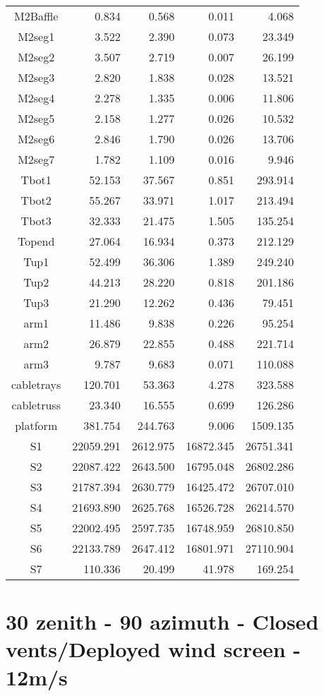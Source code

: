 \begin{longtable}{crrrr}
 M2Baffle & 0.834 & 0.568 & 0.011 & 4.068 \\
 M2seg1 & 3.522 & 2.390 & 0.073 & 23.349 \\
 M2seg2 & 3.507 & 2.719 & 0.007 & 26.199 \\
 M2seg3 & 2.820 & 1.838 & 0.028 & 13.521 \\
 M2seg4 & 2.278 & 1.335 & 0.006 & 11.806 \\
 M2seg5 & 2.158 & 1.277 & 0.026 & 10.532 \\
 M2seg6 & 2.846 & 1.790 & 0.026 & 13.706 \\
 M2seg7 & 1.782 & 1.109 & 0.016 & 9.946 \\
 Tbot1 & 52.153 & 37.567 & 0.851 & 293.914 \\
 Tbot2 & 55.267 & 33.971 & 1.017 & 213.494 \\
 Tbot3 & 32.333 & 21.475 & 1.505 & 135.254 \\
 Topend & 27.064 & 16.934 & 0.373 & 212.129 \\
 Tup1 & 52.499 & 36.306 & 1.389 & 249.240 \\
 Tup2 & 44.213 & 28.220 & 0.818 & 201.186 \\
 Tup3 & 21.290 & 12.262 & 0.436 & 79.451 \\
 arm1 & 11.486 & 9.838 & 0.226 & 95.254 \\
 arm2 & 26.879 & 22.855 & 0.488 & 221.714 \\
 arm3 & 9.787 & 9.683 & 0.071 & 110.088 \\
 cabletrays & 120.701 & 53.363 & 4.278 & 323.588 \\
 cabletruss & 23.340 & 16.555 & 0.699 & 126.286 \\
 platform & 381.754 & 244.763 & 9.006 & 1509.135 \\
 S1 & 22059.291 & 2612.975 & 16872.345 & 26751.341 \\
 S2 & 22087.422 & 2643.500 & 16795.048 & 26802.286 \\
 S3 & 21787.394 & 2630.779 & 16425.472 & 26707.010 \\
 S4 & 21693.890 & 2625.768 & 16526.728 & 26214.570 \\
 S5 & 22002.495 & 2597.735 & 16748.959 & 26810.850 \\
 S6 & 22133.789 & 2647.412 & 16801.971 & 27110.904 \\
 S7 & 110.336 & 20.499 & 41.978 & 169.254 \\
\bottomrule
\end{longtable}




\section{30 zenith - 90 azimuth - Closed vents/Deployed wind screen - 12m/s}
\label{zen30az090_CD12}

